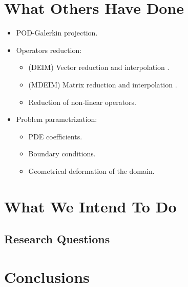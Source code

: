 \documentclass[../main.tex]{subfiles}
\begin{document}
\section{What Others Have Done}
\begin{itemize}
    \item POD-Galerkin projection.
    \item Operators reduction:
    \begin{itemize}
        \item (DEIM) Vector reduction and interpolation \cite{2010_nonlinearModelReductionDeim_chaturantabut}.
        \item (MDEIM) Matrix reduction and interpolation \cite{2015_efficientModelReductionParametrizedSystemsMatrixDeim_Negri}.
        \item Reduction of non-linear operators.
    \end{itemize}
    \item Problem parametrization: 
    \begin{itemize}
        \item PDE coefficients.
        \item Boundary conditions.
        \item Geometrical deformation of the domain.
    \end{itemize}
\end{itemize}

\section{What We Intend To Do}

\subsection{Research Questions}

\section{Conclusions}
\label{sec:conclusions}

\printbibliography
\end{document}
